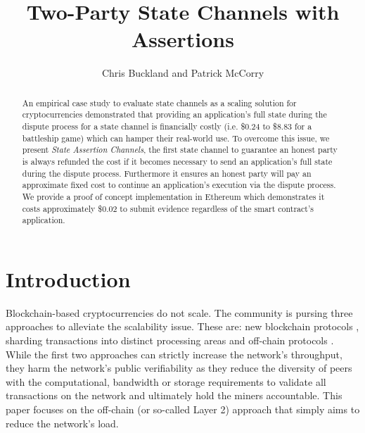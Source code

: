 \documentclass{llncs}
\begin{document}
	\title{Two-Party State Channels with Assertions } 
	
	\author{Chris Buckland and Patrick McCorry}
	
	
	
	\maketitle
	\begin{abstract}
	An empirical case study to evaluate state channels as a scaling solution for cryptocurrencies demonstrated that providing an application's full state during the dispute process for a state channel is financially costly (i.e. \$0.24 to \$8.83 for a battleship game) which can hamper their real-world use. 
	To overcome this issue, we present \emph{State Assertion Channels}, the first state channel to guarantee  an honest party is always refunded the cost if it becomes necessary to send an application's full state during the dispute process. 
	Furthermore it ensures an honest party will pay an approximate fixed cost to continue an application's execution via the dispute process. 
	We provide a proof of concept implementation in Ethereum which demonstrates it costs approximately \$0.02 to submit evidence  regardless of the smart contract's application. 

	\end{abstract} 

\section{Introduction}

Blockchain-based cryptocurrencies do not scale.
The community is pursing three approaches to alleviate the scalability issue. These are: new blockchain protocols \cite{bano2017consensus,sompolinsky2016spectre,eyal2016bitcoin}, sharding transactions into distinct processing areas \cite{al2017chainspace,kokoris2018omniledger,luu2016secure} and off-chain protocols \cite{battleship,counterfactual,celernetwork,decker2015fast,poon2016bitcoin,poon2017plasma,khalil2018nocust}. 
While the first two approaches can strictly increase the network's throughput, they harm the network's public verifiability as they reduce the diversity of peers with the computational, bandwidth or storage requirements to validate all transactions on the network and ultimately hold the miners accountable. \cite{gervais2016security,croman2016scaling} 
This paper focuses on the off-chain (or so-called Layer 2) approach that simply aims to reduce the network's load.
\end{document}

